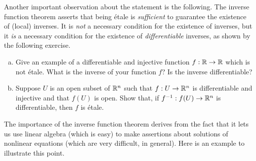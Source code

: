 Another important observation about the statement is the following. The inverse function theorem asserts that being \'etale is \emph{sufficient} to guarantee the existence of (local) inverses. It is \emph{not} a necessary condition for the existence of inverses, but it \emph{is} a necessary condition for the existence of \emph{differentiable} inverses, as shown by the following exercise. 

\begin{exercise}
	\begin{enumerate}[(a)]
		\item Give an example of a differentiable and injective function $f : \mathbb{R} \to \mathbb{R}$ which is not \'etale. What is the inverse of your function $f$? Is the inverse differentiable? 
		\item Suppose $U$ is an open subset of $\mathbb{R}^n$ such that $f : U \to \mathbb{R}^n$ is differentiable and injective and that $f(U)$ is open. Show that, if $f^{-1} : f(U) \to \mathbb{R}^n$ is differentiable, then $f$ is \'etale.  
	\end{enumerate}
\end{exercise}

The importance of the inverse function theorem derives from the fact that it lets us use linear algebra (which is easy) to make assertions about solutions of nonlinear equations (which are very difficult, in general). Here is an example to illustrate this point. 

